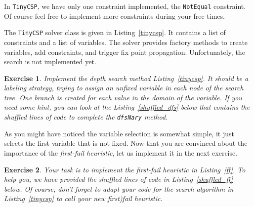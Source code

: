 \documentclass{article}
\newtheorem{exercise}{Exercise}[section]
\begin{document}
    In \texttt{TinyCSP}, we have only one constraint implemented, the \texttt{NotEqual} constraint.
    Of course feel free to implement more constraints during your free times.

    \begin{minipage}{\linewidth}
        
    \end{minipage}


    The \texttt{TinyCSP} solver class is given in Listing~\ref{tinycsp}.
    It contains a list of constraints and a list of variables.
    The solver provides factory methods to create variables, add constraints, and trigger fix point propagation.
    Unfortunately, the search is not implemented yet.

    \begin{exercise}
        Implement the depth search method Listing~\ref{tinycsp}.
        It should be a labeling strategy, trying to assign an unfixed variable in each node of the search tree.
        One branch is created for each value in the domain of the variable.
        If you need some hint, you can look at the Listing~\ref{shuffled_dfs} below
        that contains the shuffled lines of code to complete the \texttt{dfsNary} method.
    \end{exercise}

    \begin{minipage}{\linewidth}
        
    \end{minipage}

    \begin{minipage}{\linewidth}
        
    \end{minipage}

    As you might have noticed the variable selection is somewhat simple,
    it just selects the first variable that is not fixed.
    Now that you are convinced about the importance of the \emph{first-fail heuristic},
    let us implement it in the next exercise.

    \begin{exercise}
        Your task is to implement the \emph{first-fail} heuristic in Listing~\ref{ff}.
        To help you, we have provided the shuffled lines of code in Listing~\ref{shuffled_ff} below.
        Of course, don't forget to adapt your code for the search algorithm
        in Listing~\ref{tinycsp} to call your new first)fail heuristic.
    \end{exercise}
\end{document}
